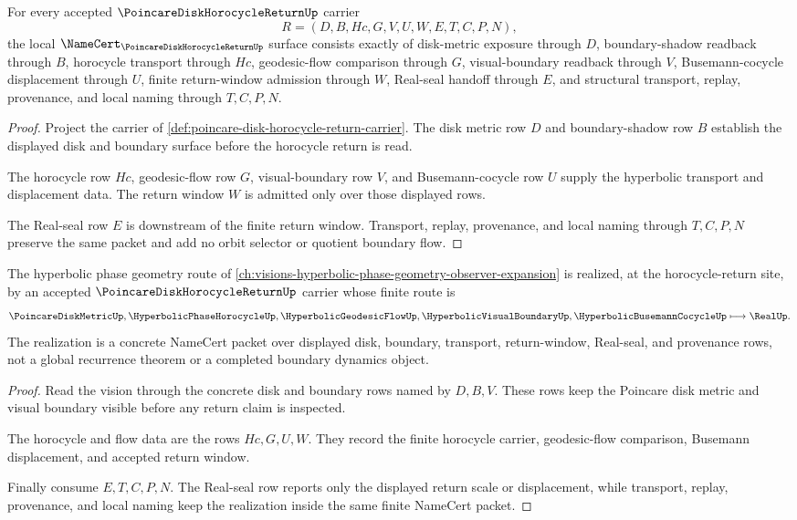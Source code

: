 \begin{theorem}
\label{thm:poincare-disk-horocycle-return-namecert-obligations}
For every accepted $\PoincareDiskHorocycleReturnUp$ carrier
$$
R=(D,B,Hc,G,V,U,W,E,T,C,P,N),
$$
the local $\NameCert_{\PoincareDiskHorocycleReturnUp}$ surface consists exactly of disk-metric exposure through $D$, boundary-shadow readback through $B$, horocycle transport through $Hc$, geodesic-flow comparison through $G$, visual-boundary readback through $V$, Busemann-cocycle displacement through $U$, finite return-window admission through $W$, Real-seal handoff through $E$, and structural transport, replay, provenance, and local naming through $T,C,P,N$.
\end{theorem}
\begin{proof}
Project the carrier of \autoref{def:poincare-disk-horocycle-return-carrier}. The disk metric row $D$ and boundary-shadow row $B$ establish the displayed disk and boundary surface before the horocycle return is read.

The horocycle row $Hc$, geodesic-flow row $G$, visual-boundary row $V$, and Busemann-cocycle row $U$ supply the hyperbolic transport and displacement data. The return window $W$ is admitted only over those displayed rows.

The Real-seal row $E$ is downstream of the finite return window. Transport, replay, provenance, and local naming through $T,C,P,N$ preserve the same packet and add no orbit selector or quotient boundary flow.
\end{proof}

\begin{theorem}
\label{thm:poincare-disk-horocycle-return-vision-realization}
The hyperbolic phase geometry route of \autoref{ch:visions-hyperbolic-phase-geometry-observer-expansion} is realized, at the horocycle-return site, by an accepted $\PoincareDiskHorocycleReturnUp$ carrier whose finite route is
$$
\PoincareDiskMetricUp,\HyperbolicPhaseHorocycleUp,\HyperbolicGeodesicFlowUp,\HyperbolicVisualBoundaryUp,\HyperbolicBusemannCocycleUp \longmapsto \RealUp .
$$
The realization is a concrete NameCert packet over displayed disk, boundary, transport, return-window, Real-seal, and provenance rows, not a global recurrence theorem or a completed boundary dynamics object.
\end{theorem}
\begin{proof}
Read the vision through the concrete disk and boundary rows named by $D,B,V$. These rows keep the Poincare disk metric and visual boundary visible before any return claim is inspected.

The horocycle and flow data are the rows $Hc,G,U,W$. They record the finite horocycle carrier, geodesic-flow comparison, Busemann displacement, and accepted return window.

Finally consume $E,T,C,P,N$. The Real-seal row reports only the displayed return scale or displacement, while transport, replay, provenance, and local naming keep the realization inside the same finite NameCert packet.
\end{proof}

